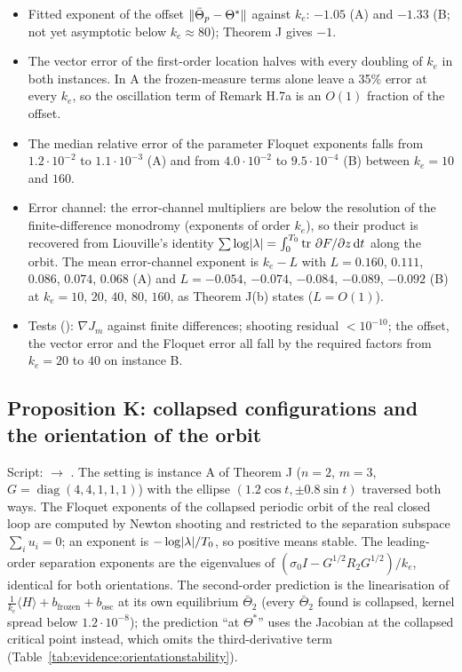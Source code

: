 \begin{itemize}
  \item Fitted exponent of the offset $\lVert \bar\Theta_p-\Theta^*\rVert$ against $k_e$: $-1.05$ (A) and $-1.33$ (B; not
    yet asymptotic below $k_e\approx80$); Theorem J gives $-1$.
  \item The vector error of the first-order location halves with every doubling of $k_e$ in both instances. In A the
    frozen-measure terms alone leave a 35\% error at every $k_e$, so the oscillation term of Remark H.7a is an
    $O(1)$ fraction of the offset.
  \item The median relative error of the parameter Floquet exponents falls from $1.2\cdot10^{-2}$ to
    $1.1\cdot10^{-3}$ (A) and from $4.0\cdot10^{-2}$ to $9.5\cdot10^{-4}$ (B) between $k_e=10$ and $160$.
  \item Error channel: the error-channel multipliers are below the resolution of the finite-difference monodromy
    (exponents of order $k_e$), so their product is recovered from Liouville's identity
    $\sum\log\lvert \lambda\rvert=\int_0^{T_0}\operatorname{tr}\,\partial F/\partial z\,\mathrm{d} t$ along the orbit. The mean error-channel
    exponent is $k_e-L$ with $L=0.160$, $0.111$, $0.086$, $0.074$, $0.068$ (A) and $L=-0.054$, $-0.074$, $-0.084$,
    $-0.089$, $-0.092$ (B) at $k_e=10$, $20$, $40$, $80$, $160$, as Theorem J(b) states ($L=O(1)$).
  \item Tests (): $\nabla J_m$ against finite differences; shooting residual
    $<10^{-10}$; the offset, the vector error and the Floquet error all fall by the required factors from $k_e=20$ to
    $40$ on instance B.
\end{itemize}

\subsection{Proposition K: collapsed configurations and the orientation of the orbit}

Script:  $\to$ . The setting is instance A of
Theorem J ($n=2$, $m=3$, $G=\operatorname{diag}(4,4,1,1,1)$) with the ellipse $(1.2\cos t,\pm0.8\sin t)$ traversed
both ways. The Floquet exponents of the collapsed periodic orbit of the real closed loop are computed by Newton
shooting and restricted to the separation subspace $\sum_iu_i=0$; an exponent is $-\log\lvert \lambda\rvert/T_0$, so
positive means stable. The leading-order separation exponents are the eigenvalues of
$(\sigma_0I-G^{1/2}R_2G^{1/2})/k_e$, identical for both orientations. The second-order prediction is the
linearisation of $\frac1{k_e}\langle H\rangle+b_{\mathrm{frozen}}+b_{\mathrm{osc}}$ at its own equilibrium
$\bar\Theta_2$ (every $\bar\Theta_2$ found is collapsed, kernel spread below $1.2\cdot10^{-8}$); the prediction ``at
$\Theta^*$'' uses the Jacobian at the collapsed critical point instead, which omits the third-derivative term
(Table~\ref{tab:evidence:orientationstability}).

